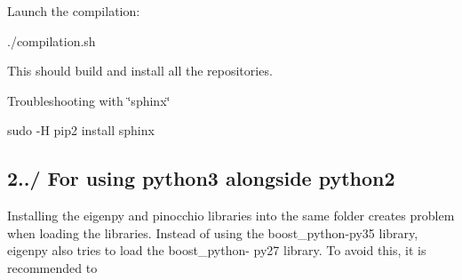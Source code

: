 \begin{DoxyEnumerate}
\begin{DoxyItemize}
\end{DoxyItemize}
\item Launch the compilation\+: 
\begin{DoxyCode}
./compilation.sh
\end{DoxyCode}
 This should build and install all the repositories.
\begin{DoxyItemize}
\item Troubleshooting with \char`\"{}sphinx\char`\"{} 
\begin{DoxyCode}
sudo -H pip2 install sphinx
\end{DoxyCode}

\end{DoxyItemize}
\end{DoxyEnumerate}\hypertarget{subpage_installation_install_subsec_python2_3}{}\subsection{2../ For using python3 alongside python2}\label{subpage_installation_install_subsec_python2_3}
Installing the eigenpy and pinocchio libraries into the same folder creates problem when loading the libraries. Instead of using the boost\+\_\+python-\/py35 library, eigenpy also tries to load the boost\+\_\+python-\/ py27 library. To avoid this, it is recommended to
